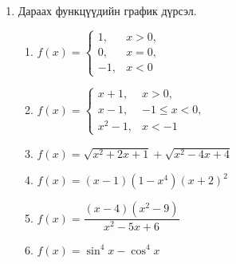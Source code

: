 \begin{enumerate}
\begin{enumerate}
  \item $y = \sin x, \quad x \in \left[\tfrac{\pi}{2}, \tfrac{3\pi}{2}\right].$
  \item $y = \cos x, \quad x \in [-\pi, 0].$
  \item $y = \cos x, \quad x \in [2\pi, 3\pi].$
\end{enumerate}
\item Дараах функцүүдийн график дүрсэл.
\begin{enumerate}
    \item $f(x) =
    \begin{cases}
      1, & x > 0, \\
     0, & x =0, \\
      -1, & x < 0
    \end{cases}$
     \item $f(x) =
    \begin{cases}
      x+1, & x > 0, \\
     x-1, & -1\leq x < 0, \\
      x^2-1, & x < -1
    \end{cases}$
    \item $f(x)=\sqrt{x^2+2x+1}+\sqrt{x^2-4x+4}$
    \item $f(x)=(x-1)(1-x^4)(x+2)^2$
    \item $f(x)=\dfrac{(x-4)(x^2-9)}{x^2-5x+6}$
    \item $f(x)=\sin^4x-\cos^4 x$
\end{enumerate}
\end{enumerate}
